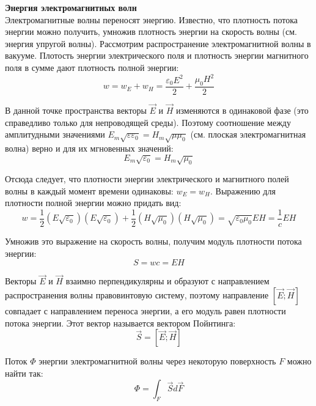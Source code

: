 \documentclass{article}
\begin{document}
	
	\textbf{Энергия электромагнитных волн}\\

	Электромагнитные волны переносят энергию. Известно, что плотность потока энергии можно получить, умножив плотность энергии на скорость волны (см. энергия упругой волны). Рассмотрим распространение электромагнитной волны в вакууме. Плотость энергии электрического поля и плотность энергии магнитного поля в сумме дают плотность полной энергии:
	\begin{equation}
		w=w_E+w_H=\frac{\varepsilon_0E^2}{2}+\frac{\mu_0H^2}{2}
	\end{equation}

	В данной точке пространства векторы $\vec E$ и $\vec H$ изменяются в одинаковой фазе (это справедливо только для непроводящей среды). Поэтому соотношение между амплитудными значениями $E_m\sqrt{\varepsilon\varepsilon_0}=H_m\sqrt{\mu\mu_0}$ (см. плоская электромагнитная волна) верно и для их мгновенных значений:
	\begin{equation}
		E_m\sqrt{\varepsilon_0}=H_m\sqrt{\mu_0}
	\end{equation}

	Отсюда следует, что плотности энергии электрического и магнитного полей волны в каждый момент времени одинаковы: $w_E=w_H$. Выражению для плотности полной энергии можно придать вид:
	\begin{equation}
		w=\frac{1}{2}(E\sqrt{\varepsilon_0})(E\sqrt{\varepsilon_0})+\frac{1}{2}(H\sqrt{\mu_0})(H\sqrt{\mu_0})=\sqrt{\varepsilon_0\mu_0}EH=\frac{1}{c}EH
	\end{equation}

	Умножив это выражение на скорость волны, получим модуль плотности потока энергии:
	\begin{equation}
		S = wc = EH
	\end{equation}

	Векторы $\vec E$ и $\vec H$ взаимно перпендикулярны и образуют с направлением распространения волны правовинтовую систему, поэтому направление $[\vec E;\vec H]$ совпадает с направлением переноса энергии, а его модуль равен плотности потока энергии. Этот вектор называется вектором Пойнтинга:
	\begin{equation}
		\vec S = [\vec E;\vec H]
	\end{equation}

	Поток $\Phi$ энергии электромагнитной волны через некоторую поверхность $F$ можно найти так:
	\begin{equation}
		\Phi = \int_F \vec Sd\vec F
	\end{equation}
\end{document}

